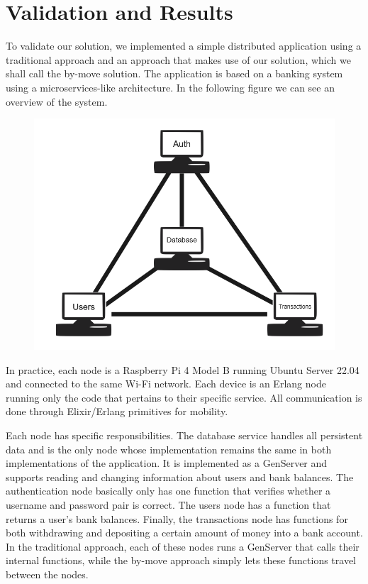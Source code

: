 
\chapter{Validation and Results}
\label{cha:validationresults}

To validate our solution, we implemented a simple distributed application using a traditional approach and an approach that makes use of our solution, which we shall call the by-move solution. The application is based on a banking system using a microservices-like architecture. In the following figure we can see an overview of the system.
\begin{figure}[h]
\includegraphics[scale=0.60]{figures/validation.png}
\centering
\end{figure}

In practice, each node is a Raspberry Pi 4 Model B running Ubuntu Server 22.04 and connected to the same Wi-Fi network. Each device is an Erlang node running only the code that pertains to their specific service. All communication is done through Elixir/Erlang primitives for mobility.

Each node has specific responsibilities. The database service handles all persistent data and is the only node whose implementation remains the same in both implementations of the application. It is implemented as a GenServer and supports reading and changing information about users and bank balances. The authentication node basically only has one function that verifies whether a username and password pair is correct. The users node has a function that returns a user's bank balances. Finally, the transactions node has functions for both withdrawing and depositing a certain amount of money into a bank account. In the traditional approach, each of these nodes runs a GenServer that calls their internal functions, while the by-move approach simply lets these functions travel between the nodes.

